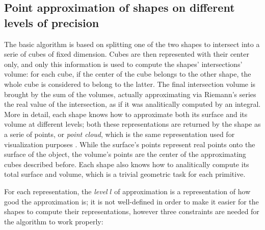 \subsection{Point approximation of shapes on different levels of precision}
The basic algorithm is based on splitting one of the two shapes to intersect into a serie of cubes of
fixed dimension.
Cubes are then represented with their center only, and only this information is
used to compute the shapes' intersections' volume: for each cube, if the center
of the cube belongs to the other shape, the whole cube is considered to belong
to the latter. The final intersection volume is brought by the sum of the
volumes, actually approximating via Riemann's series the real value of the
intersection, as if it was
analitically computed by an integral. More in detail, each shape knows how to
approximate both its surface and its volume at different levels; both these
representations are returned by the shape as a serie of points, or \emph{point
cloud}, which is the same representation used for visualization purposes%
. While the surface's points represent real points onto the surface of the
object, the volume's points are the center of the approximating cubes described
before. Each shape also knows how to analitically compute its total surface and
volume, which is a trivial geometric task for each primitive.

For each representation, the \emph{level} $l$ of approximation is a representation
of how good the approximation is; it is not well-defined in order to make it
easier for the shapes to compute their representations, however three
constraints are needed for the algorithm to work properly:

